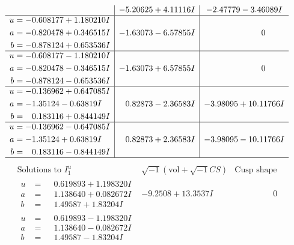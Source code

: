 \documentclass[1p]{elsarticle_modified}
\theoremstyle{definition}
\newcommand{\I}{\sqrt{-1}}
\begin{document}
$$\begin{array}{c|c|c}
 & -5.20625 + 4.11116 I & -2.47779 - 3.46089 I \\ \hline\begin{aligned}
u &= -0.608177 + 1.180210 I \\
a &= -0.820478 + 0.346515 I \\
b &= -0.878124 + 0.653536 I\end{aligned}
 & -1.63073 - 6.57855 I & \phantom{-0.000000 } 0 \\ \hline\begin{aligned}
u &= -0.608177 - 1.180210 I \\
a &= -0.820478 - 0.346515 I \\
b &= -0.878124 - 0.653536 I\end{aligned}
 & -1.63073 + 6.57855 I & \phantom{-0.000000 } 0 \\ \hline\begin{aligned}
u &= -0.136962 + 0.647085 I \\
a &= -1.35124 - 0.63819 I \\
b &= \phantom{-}0.183116 + 0.844149 I\end{aligned}
 & \phantom{-}0.82873 - 2.36583 I & -3.98095 + 10.11766 I \\ \hline\begin{aligned}
u &= -0.136962 - 0.647085 I \\
a &= -1.35124 + 0.63819 I \\
b &= \phantom{-}0.183116 - 0.844149 I\end{aligned}
 & \phantom{-}0.82873 + 2.36583 I & -3.98095 - 10.11766 I\\
 \hline 
 \end{array}$$\newpage$$\begin{array}{c|c|c}  
\text{Solutions to }I^u_{1}& \I (\text{vol} + \sqrt{-1}CS) & \text{Cusp shape}\\
 \hline 
\begin{aligned}
u &= \phantom{-}0.619893 + 1.198320 I \\
a &= \phantom{-}1.138640 + 0.082672 I \\
b &= \phantom{-}1.49587 + 1.83204 I\end{aligned}
 & -9.2508 + 13.3537 I & \phantom{-0.000000 } 0 \\ \hline\begin{aligned}
u &= \phantom{-}0.619893 - 1.198320 I \\
a &= \phantom{-}1.138640 - 0.082672 I \\
b &= \phantom{-}1.49587 - 1.83204 I\end{aligned}

\end{array}$$
\end{document}
